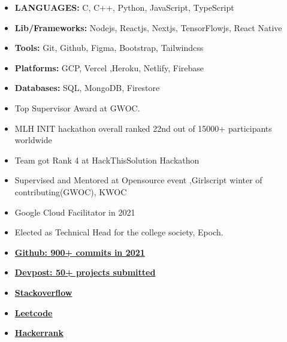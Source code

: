 
\begin{itemize}
    \item \textbf{LANGUAGES:} C, C++, Python, JavaScript, TypeScript
    \item \textbf{Lib/Frameworks:}  Nodejs, Reactjs, Nextjs, TensorFlowjs, React Native
    \item \textbf{Tools:} Git, Github, Figma, Bootstrap, Tailwindcss
    \item \textbf{Platforms:} GCP, Vercel ,Heroku, Netlify, Firebase
    \item \textbf{Databases:} SQL, MongoDB, Firestore
\end{itemize}




\begin{itemize}
    \item Top Supervisor Award at GWOC.
    \item MLH INIT hackathon overall ranked  22nd out of 15000+ participants worldwide
    \item Team got Rank 4 at HackThisSolution Hackathon
    \item Supervised and Mentored at Opensource event ,Girlscript winter of contributing(GWOC), KWOC
    \item Google Cloud Facilitator in 2021
    \item Elected as Technical Head for the college society, Epoch.
\end{itemize}

\begin{itemize}
   \item \textbf{\href{https://github.com/ghulamyazdani}{Github: 900+ commits in 2021}}
    \item \textbf{\href{https://devpost.com/ghulamyazdani12?ref_content=user-portfolio&ref_feature=portfolio&ref_medium=global-nav}{Devpost: 50+ projects submitted}}
    \item  \textbf{\href{ https://stackoverflow.com/users/15324021/ghulam-yazdani}{Stackoverflow}}
    \item \textbf{\href{https://leetcode.com/Ghulamyazdani/}{Leetcode}}
    \item  \textbf{\href{https://www.hackerrank.com/Ghulamyazdani}{Hackerrank}}
    
   
\end{itemize}

